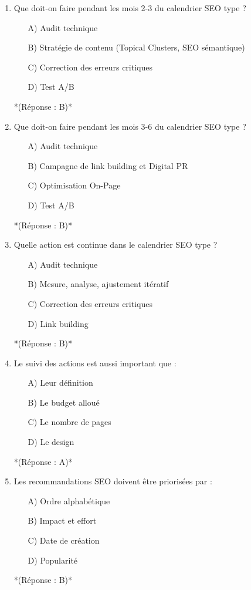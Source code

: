 \documentclass[12pt,a4paper,twoside]{report}
\begin{document}
\begin{enumerate}
    \item Que doit-on faire pendant les mois 2-3 du calendrier SEO type ?
    \begin{itemize}
        \item[A)] Audit technique
        \item[B)] Stratégie de contenu (Topical Clusters, SEO sémantique)
        \item[C)] Correction des erreurs critiques
        \item[D)] Test A/B
    \end{itemize}
    *(Réponse : B)*

    \item Que doit-on faire pendant les mois 3-6 du calendrier SEO type ?
    \begin{itemize}
        \item[A)] Audit technique
        \item[B)] Campagne de link building et Digital PR
        \item[C)] Optimisation On-Page
        \item[D)] Test A/B
    \end{itemize}
    *(Réponse : B)*

    \item Quelle action est continue dans le calendrier SEO type ?
    \begin{itemize}
        \item[A)] Audit technique
        \item[B)] Mesure, analyse, ajustement itératif
        \item[C)] Correction des erreurs critiques
        \item[D)] Link building
    \end{itemize}
    *(Réponse : B)*

    \item Le suivi des actions est aussi important que :
    \begin{itemize}
        \item[A)] Leur définition
        \item[B)] Le budget alloué
        \item[C)] Le nombre de pages
        \item[D)] Le design
    \end{itemize}
    *(Réponse : A)*

    \item Les recommandations SEO doivent être priorisées par :
    \begin{itemize}
        \item[A)] Ordre alphabétique
        \item[B)] Impact et effort
        \item[C)] Date de création
        \item[D)] Popularité
    \end{itemize}
    *(Réponse : B)*


\end{enumerate}
\end{document}
